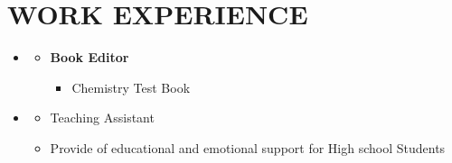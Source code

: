\documentclass[10pt,a4paper,sans]{moderncv} %
\begin{document}
	\vspace{ 1.3 em}
	
	\vspace{-2.3em}
	\section{WORK EXPERIENCE}

	\begin{itemize}
		\item \href{https://kheilisabz.com/}{}
		
		\begin{itemize}
			\item \textbf{Book Editor} 
			    \begin{itemize}
			        \item Chemistry Test Book 
			        
				\end{itemize}
		\end{itemize}
	\end{itemize}
	
	
	\vspace{0.71 em}
	
		\begin{itemize}
		
		\item \href{https://www.kanoon.ir/}{}
		
		
		\begin{itemize}
			
			\item Teaching Assistant
				\item Provide of educational and emotional support for High school Students

		\end{itemize}
	\end{itemize}
	
	
	
	
	
	
	
	\vspace{-1.0em}
	
\end{document}
